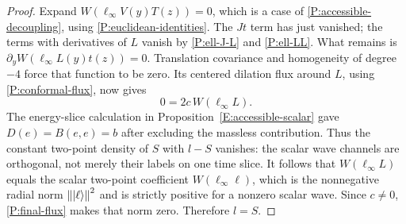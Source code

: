 \begin{proof}
Expand $W(\ell_\infty V(y)T(z))=0$, which is a case of
\eqref{P:accessible-decoupling}, using
\eqref{P:euclidean-identities}.  The $Jt$ term has just vanished;
the terms with derivatives of $L$ vanish by
\eqref{P:ell-J-L} and \eqref{P:ell-LL}.  What remains is
$\partial_yW(\ell_\infty L(y)t(z))=0$.
Translation covariance and homogeneity of degree $-4$ force that
function to be zero.  Its centered dilation flux around $L$,
using \eqref{P:conformal-flux}, now gives
\begin{equation}
 0=2c\,W(\ell_\infty L).
 \label{P:final-flux}
\end{equation}
The energy-slice calculation in Proposition~\ref{E:accessible-scalar}
gave $D(e)=B(e,e)=b$ after excluding the massless contribution.  Thus
the constant two-point density of $S$ with $l-S$ vanishes: the scalar
wave channels are orthogonal, not merely their labels on one time
slice.  It follows that $W(\ell_\infty L)$ equals the
scalar two-point coefficient $W(\ell_\infty\ell)$, which is the
nonnegative radial norm $\left\lVert|\ell\rangle\right\rVert^2$ and is strictly
positive for a nonzero scalar wave.  Since $c\ne0$,
\eqref{P:final-flux} makes that norm zero.  Therefore $l=S$.
\end{proof}
